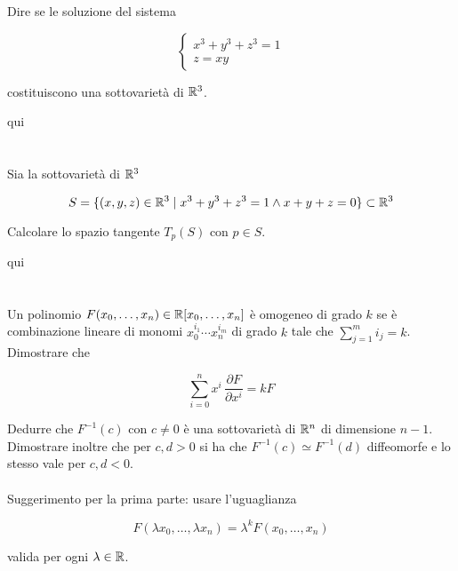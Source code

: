 \begin{tcolorbox}
	Dire se le soluzione del sistema
	
	\begin{equation}
		\begin{cases}
			x^{3} + y^{3} + z^{3} = 1\\
			z = xy
		\end{cases}
	\end{equation}
	
	costituiscono una sottovarietà di $ \mathbb{R}^{3} $.
\end{tcolorbox}

qui

%

\newpage

%

\section{}\label{BONUS2-3}

\begin{tcolorbox}
	Sia la sottovarietà di $ \mathbb{R}^{3} $
	
	\begin{equation}
		S = \{ (x,y,z) \in \mathbb{R}^{3} \mid x^{3} + y^{3} + z^{3} = 1 \wedge x+y+z=0 \} \subset \mathbb{R}^{3}
	\end{equation}
	
	Calcolare lo spazio tangente $ T_{p}(S) $ con $ p \in S $.
\end{tcolorbox}

qui

%

\newpage

%

\section{}\label{es2-15}

\begin{tcolorbox}
	Un polinomio $ F(x_{0},\dots,x_{n}) \in \mathbb{R}[x_{0},\dots,x_{n}] $ è omogeneo di grado $ k $ se è combinazione lineare di monomi $ x_{0}^{i_{1}} \cdots x_{n}^{i_{m}} $ di grado $ k $ tale che $ \sum_{j=1}^{m} i_{j} = k $. Dimostrare che
	
	\begin{equation}
		\sum_{i=0}^{n} x^{i} \, \dfrac{\partial F}{\partial x^{i}} = k F
	\end{equation}
	
	Dedurre che $ F^{-1}(c) $ con $ c \neq 0 $ è una sottovarietà di $ \mathbb{R}^{n} $ di dimensione $ n-1 $. Dimostrare inoltre che per $ c,d>0 $ si ha che $ F^{-1}(c) \simeq F^{-1}(d) $ diffeomorfe e lo stesso vale per $ c,d<0 $.\\\\
	Suggerimento per la prima parte: usare l'uguaglianza
	
	\begin{equation}
		F(\lambda x_{0},\dots,\lambda x_{n}) = \lambda^{k} F(x_{0},\dots,x_{n})
	\end{equation}
	
	valida per ogni $ \lambda \in \mathbb{R} $.
\end{tcolorbox}

